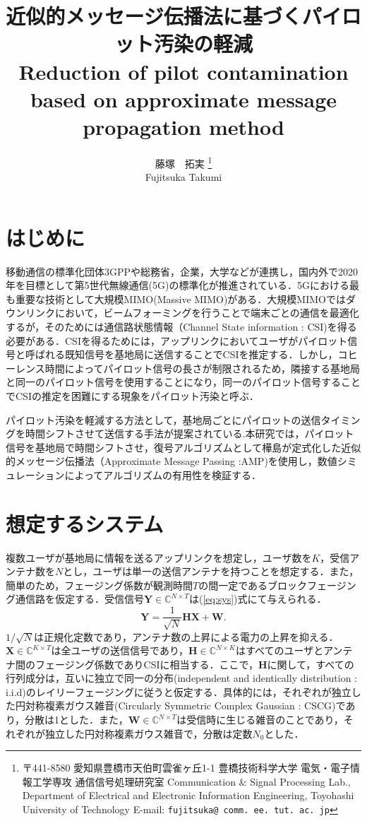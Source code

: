 \documentclass{jarticle}
\title{
  近似的メッセージ伝播法に基づくパイロット汚染の軽減 \\
  Reduction of pilot contamination based on approximate message propagation method
}
\author{
藤塚　拓実
  \thanks{ 
    〒441-8580 愛知県豊橋市天伯町雲雀ヶ丘1-1 豊橋技術科学大学 電気・電子情報工学専攻 通信信号処理研究室 Communication \& Signal Processing Lab., Department of Electrical and Electronic Information Engineering, Toyohashi University of Technology
E-mail: {\tt fujitsuka@\allowbreak
comm.\allowbreak
ee.\allowbreak
tut.\allowbreak
ac.\allowbreak
jp}
  }\\
  Fujitsuka Takumi
%
%
}
\begin{document}
\maketitle

\section{はじめに}
移動通信の標準化団体3GPPや総務省，企業，大学などが連携し，国内外で2020年を目標として第5世代無線通信(5G)の標準化が推進されている\cite{5gmf}．5Gにおける最も重要な技術として大規模MIMO(Massive MIMO)\cite{Marzetta}がある．大規模MIMOではダウンリンクにおいて，ビームフォーミングを行うことで端末ごとの通信を最適化するが，そのためには通信路状態情報（Channel State information : CSI)を得る必要がある．CSIを得るためには，アップリンクにおいてユーザがパイロット信号と呼ばれる既知信号を基地局に送信することでCSIを推定する．しかし，コヒーレンス時間によってパイロット信号の長さが制限されるため，隣接する基地局と同一のパイロット信号を使用することになり，同一のパイロット信号することでCSIの推定を困難にする現象をパイロット汚染\cite{Marzetta}と呼ぶ．

パイロット汚染を軽減する方法として，基地局ごとにパイロットの送信タイミングを時間シフトさせて送信する手法が提案されている\cite{Appaiah}.本研究では，パイロット信号を基地局で時間シフトさせ，復号アルゴリズムとして樺島が定式化した近似的メッセージ伝播法（Approximate Message Passing :AMP)\cite{kabashima}を使用し，数値シミュレーションによってアルゴリズムの有用性を検証する．
\section{想定するシステム}
複数ユーザが基地局に情報を送るアップリンクを想定し，ユーザ数を$K$，受信アンテナ数を$N$とし，ユーザは単一の送信アンテナを持つことを想定する．また，簡単のため，フェージング係数が観測時間$T$の間一定であるブロックフェージング通信路を仮定する．受信信号$\boldsymbol{Y} \in \mathbb{C}^{N \times T}$は(\ref{eq:sys})式にて与えられる．
\begin{equation}
    \label{eq:sys}
    \boldsymbol{Y} = \frac{1}{\sqrt{N}}\boldsymbol{HX+W}.
\end{equation}
$1/\sqrt{N}$は正規化定数であり，アンテナ数の上昇による電力の上昇を抑える．$\boldsymbol{X}\in\mathbb{C}^{K\times T}$は全ユーザの送信信号であり，$\boldsymbol{H}\in\mathbb{C}^{N\times K}$はすべてのユーザとアンテナ間のフェージング係数でありCSIに相当する．ここで，$\boldsymbol{H}$に関して，すべての行列成分は，互いに独立で同一の分布(independent and identically distribution : i.i.d)のレイリーフェージングに従うと仮定する．具体的には，それぞれが独立した円対称複素ガウス雑音(Circularly Symmetric Complex Gaussian : CSCG)であり，分散は1とした．また，$\boldsymbol{W}\in\mathbb{C}^{N\times T}$は受信時に生じる雑音のことであり，それぞれが独立した円対称複素ガウス雑音で，分散は定数$N_0$とした．
\end{document}
